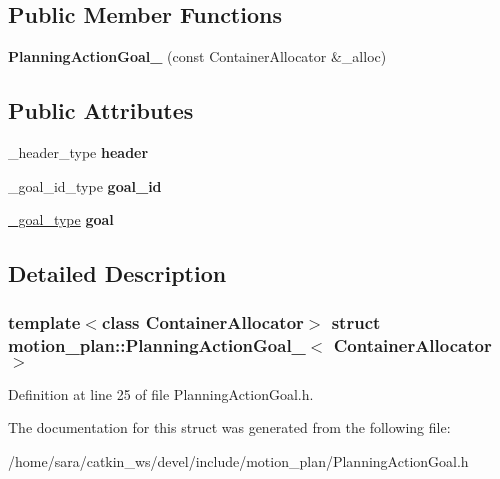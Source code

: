 \subsection*{Public Member Functions}
\begin{DoxyCompactItemize}
\item 
\mbox{\label{structmotion__plan_1_1PlanningActionGoal___aaa043a4b866d6a42acc2c4a7b826b3bb}} 
{\bfseries Planning\+Action\+Goal\+\_\+} (const Container\+Allocator \&\+\_\+alloc)
\end{DoxyCompactItemize}
\subsection*{Public Attributes}
\begin{DoxyCompactItemize}
\item 
\mbox{\label{structmotion__plan_1_1PlanningActionGoal___a3f172b51c42729e49763c26b243380c9}} 
\+\_\+header\+\_\+type {\bfseries header}
\item 
\mbox{\label{structmotion__plan_1_1PlanningActionGoal___a058e5d586b3f9ba2154533898108cb00}} 
\+\_\+goal\+\_\+id\+\_\+type {\bfseries goal\+\_\+id}
\item 
\mbox{\label{structmotion__plan_1_1PlanningActionGoal___ac3ed1c71e9e1cff97d8fd6e578055419}} 
\hyperlink{structmotion__plan_1_1PlanningGoal__}{\+\_\+goal\+\_\+type} {\bfseries goal}
\end{DoxyCompactItemize}


\subsection{Detailed Description}
\subsubsection*{template$<$class Container\+Allocator$>$\newline
struct motion\+\_\+plan\+::\+Planning\+Action\+Goal\+\_\+$<$ Container\+Allocator $>$}



Definition at line 25 of file Planning\+Action\+Goal.\+h.



The documentation for this struct was generated from the following file\+:\begin{DoxyCompactItemize}
\item 
/home/sara/catkin\+\_\+ws/devel/include/motion\+\_\+plan/Planning\+Action\+Goal.\+h\end{DoxyCompactItemize}

